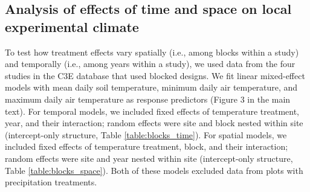 \documentclass{article}
\begin{document}
\subsection* {Analysis of effects of time and space on local experimental climate}
To test how treatment effects vary spatially (i.e., among blocks within a study) and temporally (i.e., among years within a study), we used data from the four studies in the C3E database that used blocked designs. We fit linear mixed-effect models with mean daily soil temperature, minimum daily air temperature, and maximum daily air temperature as response predictors (Figure 3 in the main text). For temporal models, we included fixed effects of temperature treatment, year, and their interaction; random effects were site and block nested within site (intercept-only structure, Table \ref{table:blocks_time}). For spatial models, we included fixed effects of temperature treatment, block, and their interaction; random effects were site and year nested within site (intercept-only structure, Table \ref{table:blocks_space}). Both of these models excluded data from plots with precipitation treatments. 
\end{document}
